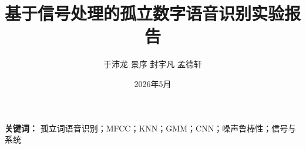 \documentclass[UTF8,a4paper,zihao=-4]{ctexart}
\title{\heiti 基于信号处理的孤立数字语音识别实验报告}
\author{
  于沛龙 \quad 景序 \quad 封宇凡 \quad 孟德轩
}
\date{2026年5月}
\begin{document}
\maketitle

\begin{abstract}

\end{abstract}

\noindent\textbf{关键词：}
孤立词语音识别；MFCC；KNN；GMM；CNN；噪声鲁棒性；信号与系统

\newpage

\tableofcontents

\newpage









\newpage
\printbibliography
\end{document}
